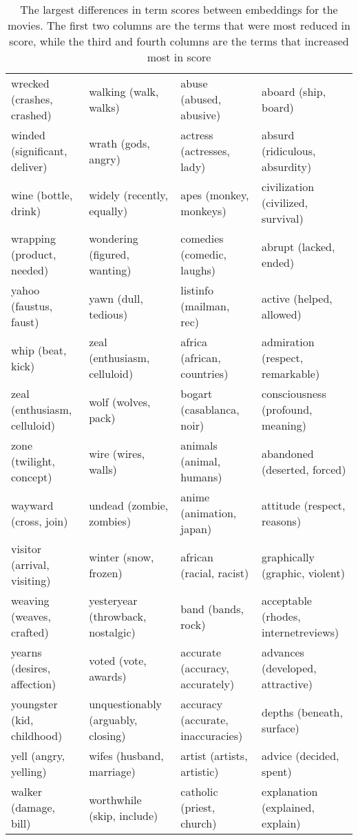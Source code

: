 \begin{landscape}
\begin{table}[]
\begin{tabular}{llll}
		wrecked (crashes, crashed)     & walking (walk, walks)              & abuse (abused, abusive)               & aboard (ship, board)                 \\
		winded (significant, deliver)  & wrath (gods, angry)                & actress (actresses, lady)             & absurd (ridiculous, absurdity)       \\
		wine (bottle, drink)           & widely (recently, equally)         & apes (monkey, monkeys)                & civilization (civilized, survival)   \\
		wrapping (product, needed)     & wondering (figured, wanting)       & comedies (comedic, laughs)            & abrupt (lacked, ended)               \\
		yahoo (faustus, faust)         & yawn (dull, tedious)               & listinfo (mailman, rec)               & active (helped, allowed)             \\
		whip (beat, kick)              & zeal (enthusiasm, celluloid)       & africa (african, countries)           & admiration (respect, remarkable)     \\
		zeal (enthusiasm, celluloid)   & wolf (wolves, pack)                & bogart (casablanca, noir)             & consciousness (profound, meaning)    \\
		zone (twilight, concept)       & wire (wires, walls)                & animals (animal, humans)              & abandoned (deserted, forced)         \\
		wayward (cross, join)          & undead (zombie, zombies)           & anime (animation, japan)              & attitude (respect, reasons)          \\
		visitor (arrival, visiting)    & winter (snow, frozen)              & african (racial, racist)              & graphically (graphic, violent)       \\
		weaving (weaves, crafted)      & yesteryear (throwback, nostalgic)  & band (bands, rock)                    & acceptable (rhodes, internetreviews) \\
		yearns (desires, affection)    & voted (vote, awards)               & accurate (accuracy, accurately)       & advances (developed, attractive)     \\
		youngster (kid, childhood)     & unquestionably (arguably, closing) & accuracy (accurate, inaccuracies)     & depths (beneath, surface)            \\
		yell (angry, yelling)          & wifes (husband, marriage)          & artist (artists, artistic)            & advice (decided, spent)              \\
		walker (damage, bill)          & worthwhile (skip, include)         & catholic (priest, church)             & explanation (explained, explain)     \\
		\end{tabular}\caption{The largest differences in term scores between embeddings for the movies. The first two columns are the terms that were most reduced in score, while the third and fourth columns are the terms that increased most in score}\label{ch5:diff}
\end{table}
\end{landscape}

